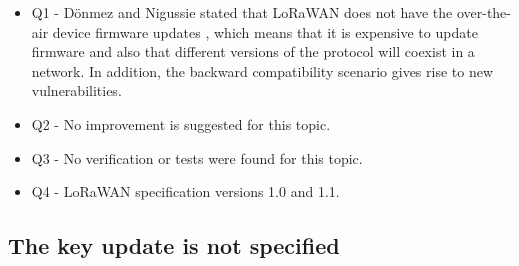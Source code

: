 \documentclass[manuscript,screen,review=false]{acmart}
\begin{document}
\begin{itemize}
\item Q1 - D\"onmez and Nigussie stated that LoRaWAN does not have the over-the-air device firmware updates \cite{02_security_procedure_LoRaWANv1.1}, which means that it is expensive to update firmware and also that different versions of the protocol will coexist in a network. In addition, the backward compatibility scenario gives rise to new vulnerabilities.

\item Q2 - No improvement is suggested for this topic.

\item Q3 - No verification or tests were found for this topic.

\item Q4 - LoRaWAN specification versions 1.0 and 1.1.
\end{itemize}

\subsection{The key update is not specified}
\end{document}
